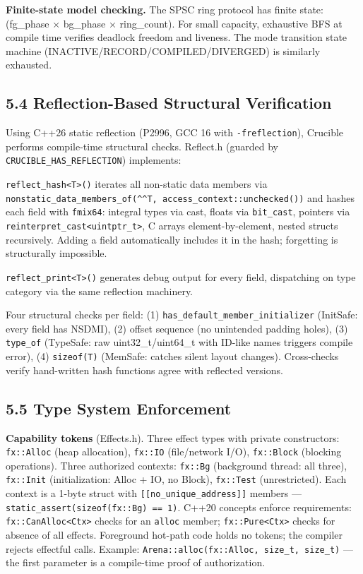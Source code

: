 \textbf{Finite-state model checking.} The SPSC ring protocol has finite state: (fg\_phase × bg\_phase × ring\_count). For small capacity, exhaustive BFS at compile time verifies deadlock freedom and liveness. The mode transition state machine (INACTIVE/RECORD/COMPILED/DIVERGED) is similarly exhausted.

\subsection{5.4 Reflection-Based Structural Verification}\label{reflection-based-structural-verification}

Using C++26 static reflection (P2996, GCC 16 with \texttt{-freflection}), Crucible performs compile-time structural checks. Reflect.h (guarded by \texttt{CRUCIBLE\_HAS\_REFLECTION}) implements:

\texttt{reflect\_hash\textless{}T\textgreater{}()} iterates all non-static data members via \texttt{nonstatic\_data\_members\_of(\^{}\^{}T,\ access\_context::unchecked())} and hashes each field with \texttt{fmix64}: integral types via cast, floats via \texttt{bit\_cast}, pointers via \texttt{reinterpret\_cast\textless{}uintptr\_t\textgreater{}}, C arrays element-by-element, nested structs recursively. Adding a field automatically includes it in the hash; forgetting is structurally impossible.

\texttt{reflect\_print\textless{}T\textgreater{}()} generates debug output for every field, dispatching on type category via the same reflection machinery.

Four structural checks per field: (1) \texttt{has\_default\_member\_initializer} (InitSafe: every field has NSDMI), (2) offset sequence (no unintended padding holes), (3) \texttt{type\_of} (TypeSafe: raw uint32\_t/uint64\_t with ID-like names triggers compile error), (4) \texttt{sizeof(T)} (MemSafe: catches silent layout changes). Cross-checks verify hand-written hash functions agree with reflected versions.

\subsection{5.5 Type System Enforcement}\label{type-system-enforcement}

\textbf{Capability tokens} (Effects.h). Three effect types with private constructors: \texttt{fx::Alloc} (heap allocation), \texttt{fx::IO} (file/network I/O), \texttt{fx::Block} (blocking operations). Three authorized contexts: \texttt{fx::Bg} (background thread: all three), \texttt{fx::Init} (initialization: Alloc + IO, no Block), \texttt{fx::Test} (unrestricted). Each context is a 1-byte struct with \texttt{{[}{[}no\_unique\_address{]}{]}} members --- \texttt{static\_assert(sizeof(fx::Bg)\ ==\ 1)}. C++20 concepts enforce requirements: \texttt{fx::CanAlloc\textless{}Ctx\textgreater{}} checks for an \texttt{alloc} member; \texttt{fx::Pure\textless{}Ctx\textgreater{}} checks for absence of all effects. Foreground hot-path code holds no tokens; the compiler rejects effectful calls. Example: \texttt{Arena::alloc(fx::Alloc,\ size\_t,\ size\_t)} --- the first parameter is a compile-time proof of authorization.

